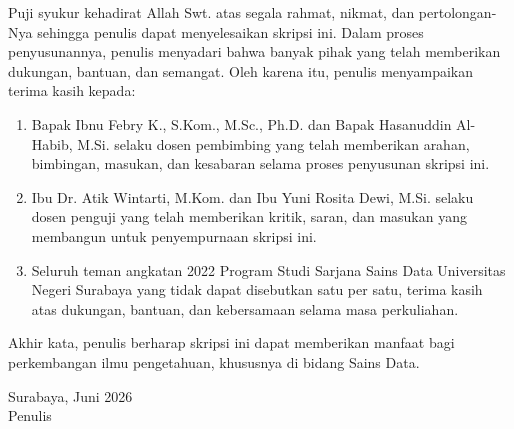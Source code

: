 \Prakata

Puji syukur kehadirat Allah Swt. atas segala rahmat, nikmat, dan pertolongan-Nya sehingga penulis dapat menyelesaikan skripsi ini. Dalam proses penyusunannya, penulis menyadari bahwa banyak pihak yang telah memberikan dukungan, bantuan, dan semangat. Oleh karena itu, penulis menyampaikan terima kasih kepada:

\begin{enumerate}[label=\arabic*., leftmargin=0.75cm, itemsep=6pt]
    \item Bapak Ibnu Febry K., S.Kom., M.Sc., Ph.D. dan Bapak Hasanuddin Al-Habib, M.Si. selaku dosen pembimbing yang telah memberikan arahan, bimbingan, masukan, dan kesabaran selama proses penyusunan skripsi ini.
    \item Ibu Dr. Atik Wintarti, M.Kom. dan Ibu Yuni Rosita Dewi, M.Si. selaku dosen penguji yang telah memberikan kritik, saran, dan masukan yang membangun untuk penyempurnaan skripsi ini.
    \item Seluruh teman angkatan 2022 Program Studi Sarjana Sains Data Universitas Negeri Surabaya yang tidak dapat disebutkan satu per satu, terima kasih atas dukungan, bantuan, dan kebersamaan selama masa perkuliahan.
\end{enumerate}

Akhir kata, penulis berharap skripsi ini dapat memberikan manfaat bagi perkembangan ilmu pengetahuan, khususnya di bidang Sains Data.

\vspace{1cm}
\begin{flushright}
    Surabaya, Juni 2026\\
    \vspace{1.5cm}
    Penulis
\end{flushright}
